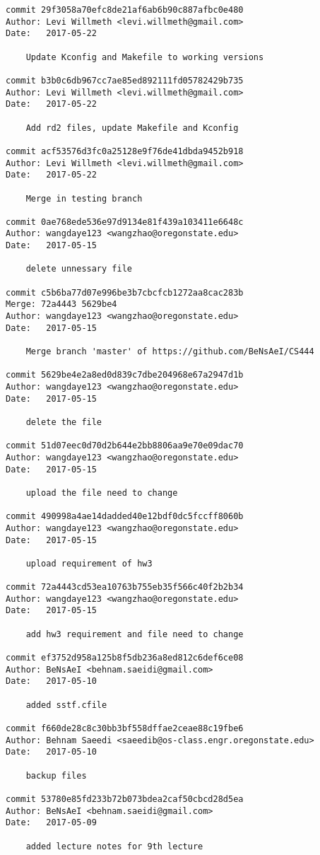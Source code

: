 \documentclass[journal,10pt,onecolumn,compsoc,letterpaper,draftclsnofoot,table,xcdraw]{IEEEtran} \usepackage[margin=0.75in]{geometry}
\begin{document}
\begin{verbatim}
commit 29f3058a70efc8de21af6ab6b90c887afbc0e480
Author: Levi Willmeth <levi.willmeth@gmail.com>
Date:   2017-05-22

    Update Kconfig and Makefile to working versions

commit b3b0c6db967cc7ae85ed892111fd05782429b735
Author: Levi Willmeth <levi.willmeth@gmail.com>
Date:   2017-05-22

    Add rd2 files, update Makefile and Kconfig

commit acf53576d3fc0a25128e9f76de41dbda9452b918
Author: Levi Willmeth <levi.willmeth@gmail.com>
Date:   2017-05-22

    Merge in testing branch

commit 0ae768ede536e97d9134e81f439a103411e6648c
Author: wangdaye123 <wangzhao@oregonstate.edu>
Date:   2017-05-15

    delete unnessary file

commit c5b6ba77d07e996be3b7cbcfcb1272aa8cac283b
Merge: 72a4443 5629be4
Author: wangdaye123 <wangzhao@oregonstate.edu>
Date:   2017-05-15

    Merge branch 'master' of https://github.com/BeNsAeI/CS444

commit 5629be4e2a8ed0d839c7dbe204968e67a2947d1b
Author: wangdaye123 <wangzhao@oregonstate.edu>
Date:   2017-05-15

    delete the file

commit 51d07eec0d70d2b644e2bb8806aa9e70e09dac70
Author: wangdaye123 <wangzhao@oregonstate.edu>
Date:   2017-05-15

    upload the file need to change

commit 490998a4ae14dadded40e12bdf0dc5fccff8060b
Author: wangdaye123 <wangzhao@oregonstate.edu>
Date:   2017-05-15

    upload requirement of hw3

commit 72a4443cd53ea10763b755eb35f566c40f2b2b34
Author: wangdaye123 <wangzhao@oregonstate.edu>
Date:   2017-05-15

    add hw3 requirement and file need to change

commit ef3752d958a125b8f5db236a8ed812c6def6ce08
Author: BeNsAeI <behnam.saeidi@gmail.com>
Date:   2017-05-10

    added sstf.cfile

commit f660de28c8c30bb3bf558dffae2ceae88c19fbe6
Author: Behnam Saeedi <saeedib@os-class.engr.oregonstate.edu>
Date:   2017-05-10

    backup files

commit 53780e85fd233b72b073bdea2caf50cbcd28d5ea
Author: BeNsAeI <behnam.saeidi@gmail.com>
Date:   2017-05-09

    added lecture notes for 9th lecture

\end{verbatim}
\end{document}

